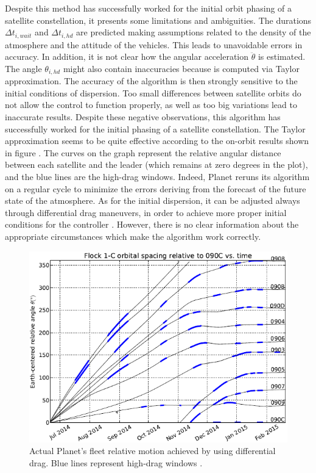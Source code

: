 Despite this method has successfully worked for the initial orbit phasing of a satellite constellation, it presents some limitations and ambiguities.
The durations $\Delta t_{i,wait}$ and $\Delta t_{i,hd}$ are predicted making assumptions related to the density of the atmosphere and the attitude of the vehicles.
This leads to unavoidable errors in accuracy.
In addition, it is not clear how the angular acceleration $\ddot{\theta}$ is estimated.
The angle $\theta_{i,hd}$ might also contain inaccuracies because is computed via Taylor approximation.
The accuracy of the algorithm is then strongly sensitive to the initial conditions of dispersion.
Too small differences between satellite orbits do not allow the control to function properly, as well as too big variations lead to inaccurate results.
Despite these negative observations, this algorithm has successfully worked for the initial phasing of a satellite constellation.
The Taylor approximation seems to be quite effective according to the on-orbit results shown in figure \cite{lee2017cubesat}.
The curves on the graph represent the relative angular distance between each satellite and the leader (which remains at zero degrees in the plot), and the blue lines are the high-drag windows.  
Indeed, Planet reruns its algorithm on a regular cycle to minimize the errors deriving from the forecast of the future state of the atmosphere.
As for the initial dispersion, it can be adjusted always through differential drag maneuvers, in order to achieve more proper initial conditions for the controller \cite{foster2015orbit}.
However, there is no clear information about the appropriate circumstances which make the algorithm work correctly.

\begin{figure}
      \centering
      \includegraphics[scale=0.8]{img/planet_orbit_results.png}
      \caption{Actual Planet's fleet relative motion achieved by using differential drag. 
      Blue lines represent high-drag windows \cite{foster2015orbit}.}
      \label{kep_high_ecc_fig}
\end{figure}


